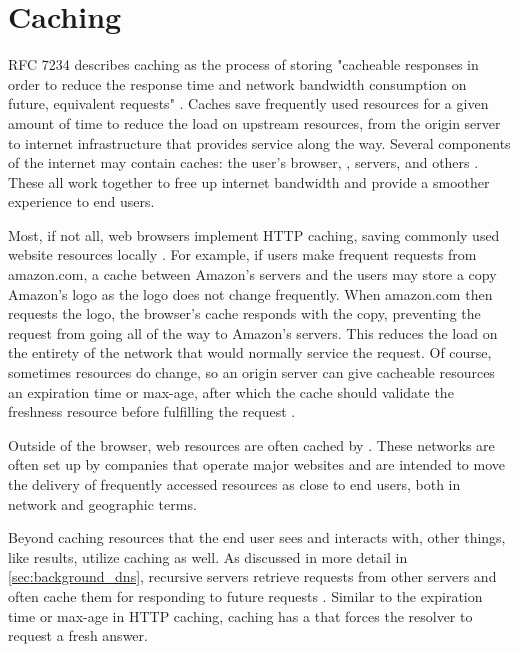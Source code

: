 \section{Caching}\label{sec:background_caching}

RFC 7234 describes caching as the process of storing "cacheable responses in order to reduce the response time and network bandwidth consumption on future, equivalent requests" \cite{rfc7234}. Caches save frequently used resources for a given amount of time to reduce the load on upstream resources, from the origin server to internet infrastructure that provides service along the way. Several components of the internet may contain caches: the user's browser, \cdns, \dns servers, and others \cite{2019HTTPCaching}. These all work together to free up internet bandwidth and provide a smoother experience to end users.

Most, if not all, web browsers implement HTTP caching, saving commonly used website resources locally \cite{Grigorik2019HTTPCaching}. For example, if users make frequent requests from amazon.com, a cache between Amazon's servers and the users may store a copy Amazon's logo as the logo does not change frequently. When amazon.com then requests the logo, the browser's cache responds with the copy, preventing the request from going all of the way to Amazon's servers. This reduces the load on the entirety of the network that would normally service the request. Of course, sometimes resources do change, so an origin server can give cacheable resources an expiration time or max-age, after which the cache should validate the freshness resource before fulfilling the request \cite{rfc7234}. 

Outside of the browser, web resources are often cached by \cdns. These networks are often set up by companies that operate major websites and are intended to move the delivery of frequently accessed resources as close to end users, both in network and geographic terms.

Beyond caching resources that the end user sees and interacts with, other things, like \dns results, utilize caching as well. As discussed in more detail in \autoref{sec:background_dns}, recursive \dns servers retrieve requests from other \dns servers and often cache them for responding to future requests \cite{rfc1035}. Similar to the expiration time or max-age in HTTP caching, \dns caching has a \ttl that forces the \dns resolver to request a fresh answer.